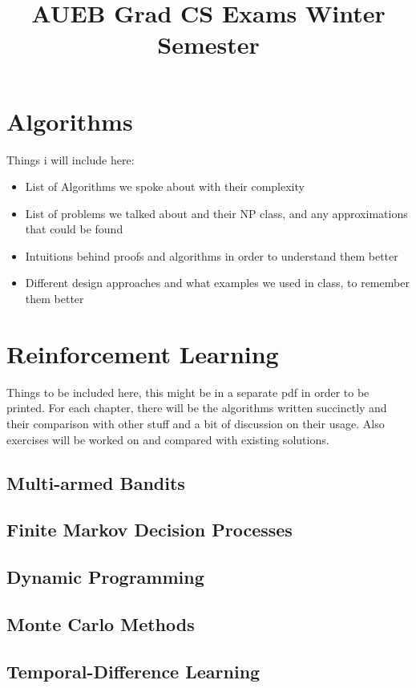 \documentclass{article}
\title{AUEB Grad CS Exams Winter Semester}
\begin{document}
\section{Algorithms}

Things i will include here:
\begin{itemize}
	\item List of Algorithms we spoke about with their complexity
	\item List of problems we talked about and their NP class, and any approximations that could be found
	\item Intuitions behind proofs and algorithms in order to understand them better
	\item Different design approaches and what examples we used in class, to remember them better
\end{itemize}
\section{Reinforcement Learning}
Things to be included here, this might be in a separate pdf in order to be printed. For each chapter, there will be the algorithms written succinctly and their comparison with other stuff and a bit of discussion on their usage. Also exercises will be worked on and compared with existing solutions.

\subsection{Multi-armed Bandits}

\subsection{Finite Markov Decision Processes}

\subsection{Dynamic Programming}

\subsection{Monte Carlo Methods}
\subsection{Temporal-Difference Learning}
\end{document}
